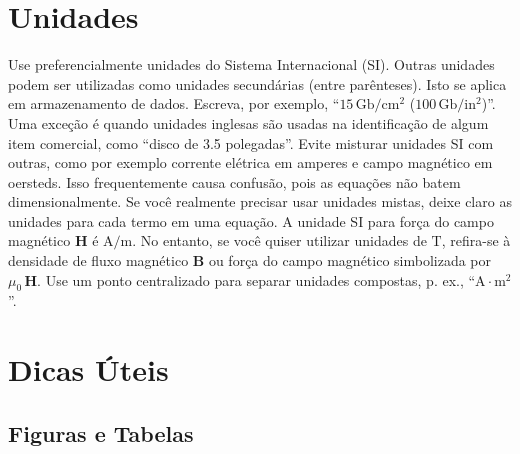 \section{Unidades}

Use preferencialmente unidades do Sistema Internacional (SI). Outras unidades
podem ser utilizadas como unidades secundárias (entre parênteses). Isto se aplica
em armazenamento de dados. Escreva,
por exemplo,  ``$15\,\mathrm{Gb}/\mathrm{cm}^2$ ($100\,\mathrm{Gb}/\mathrm{in}^2$)''. 
Uma exceção é quando unidades inglesas são usadas na identificação de algum item
comercial, como ``disco de 3.5 polegadas''. Evite misturar unidades SI com outras, 
como por exemplo corrente elétrica em amperes e campo magnético em oersteds. 
Isso frequentemente causa confusão, pois as equações não batem dimensionalmente. 
Se você realmente precisar usar unidades mistas, deixe claro as unidades para cada
termo em uma equação. A unidade SI para força do campo magnético 
$\mathbf{H}$ é $\mathrm{A}/\mathrm{m}$. No entanto, se você quiser utilizar unidades
de  $\mathrm{T}$, 
refira-se à densidade de fluxo magnético $\mathbf{B}$ ou
força do campo magnético simbolizada por $\mu_0\,\mathbf{H}$. 
Use um ponto centralizado para separar unidades compostas, p. ex.,  
``$\mathrm{A} \cdot \mathrm{m}^2$''.


\section{Dicas Úteis}

\subsection{Figuras e Tabelas}

